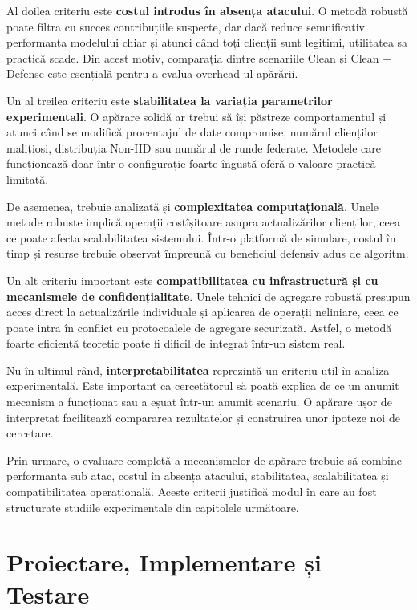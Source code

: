 \documentclass[../../main.tex]{subfiles}
\begin{document}
    Al doilea criteriu este \textbf{costul introdus în absența atacului}. O metodă robustă poate filtra cu succes contribuțiile suspecte, dar dacă reduce semnificativ performanța modelului chiar și atunci când toți clienții sunt legitimi, utilitatea sa practică scade. Din acest motiv, comparația dintre scenariile Clean și Clean + Defense este esențială pentru a evalua overhead-ul apărării.

    Un al treilea criteriu este \textbf{stabilitatea la variația parametrilor experimentali}. O apărare solidă ar trebui să își păstreze comportamentul și atunci când se modifică procentajul de date compromise, numărul clienților malițioși, distribuția Non-IID sau numărul de runde federate. Metodele care funcționează doar într-o configurație foarte îngustă oferă o valoare practică limitată.

    De asemenea, trebuie analizată și \textbf{complexitatea computațională}. Unele metode robuste implică operații costîșitoare asupra actualizărilor clienților, ceea ce poate afecta scalabilitatea sistemului. Într-o platformă de simulare, costul în timp și resurse trebuie observat împreună cu beneficiul defensiv adus de algoritm.

    Un alt criteriu important este \textbf{compatibilitatea cu infrastructură și cu mecanismele de confidențialitate}. Unele tehnici de agregare robustă presupun acces direct la actualizările individuale și aplicarea de operații neliniare, ceea ce poate intra în conflict cu protocoalele de agregare securizată. Astfel, o metodă foarte eficientă teoretic poate fi dificil de integrat într-un sistem real.

    Nu în ultimul rând, \textbf{interpretabilitatea} reprezintă un criteriu util în analiza experimentală. Este important ca cercetătorul să poată explica de ce un anumit mecanism a funcționat sau a eșuat într-un anumit scenariu. O apărare ușor de interpretat facilitează compararea rezultatelor și construirea unor ipoteze noi de cercetare.

    Prin urmare, o evaluare completă a mecanismelor de apărare trebuie să combine performanța sub atac, costul în absența atacului, stabilitatea, scalabilitatea și compatibilitatea operațională. Aceste criterii justifică modul în care au fost structurate studiile experimentale din capitolele următoare.

\chapter{Proiectare, Implementare și Testare}
\end{document}
